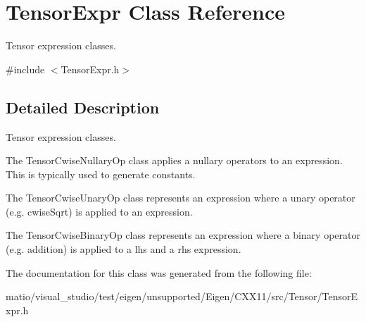 \hypertarget{class_tensor_expr}{}\section{Tensor\+Expr Class Reference}
\label{class_tensor_expr}


Tensor expression classes.  




{\ttfamily \#include $<$Tensor\+Expr.\+h$>$}



\subsection{Detailed Description}
Tensor expression classes. 

The Tensor\+Cwise\+Nullary\+Op class applies a nullary operators to an expression. This is typically used to generate constants.

The Tensor\+Cwise\+Unary\+Op class represents an expression where a unary operator (e.\+g. cwise\+Sqrt) is applied to an expression.

The Tensor\+Cwise\+Binary\+Op class represents an expression where a binary operator (e.\+g. addition) is applied to a lhs and a rhs expression. 

The documentation for this class was generated from the following file\+:\begin{DoxyCompactItemize}
\item 
matio/visual\+\_\+studio/test/eigen/unsupported/\+Eigen/\+C\+X\+X11/src/\+Tensor/\+Tensor\+Expr.\+h\end{DoxyCompactItemize}
